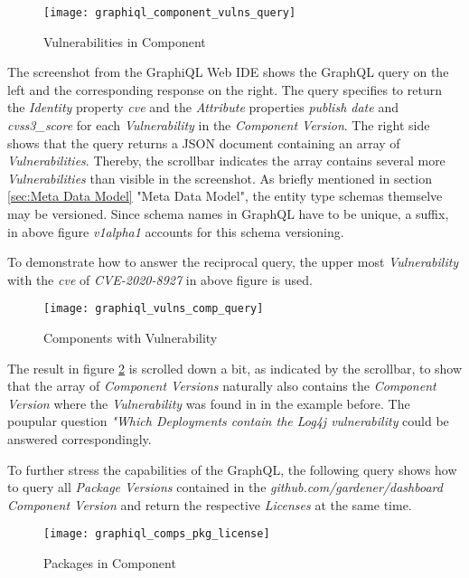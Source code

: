 \begin{figure}[H]
	\centering
	\texttt{[image: graphiql\_component\_vulns\_query]}
	\caption[Vulnerabilities in Component]{Vulnerabilities in Component }
	\label{fig:VulnsInComp}
\end{figure}

The screenshot from the GraphiQL Web IDE shows the GraphQL query on the left and the corresponding response on the right. The query specifies to return the \emph{Identity} property \emph{cve} and the \emph{Attribute} properties \emph{publish date} and \emph{cvss3\_score} for each \emph{Vulnerability} in the \emph{Component Version}. The right side shows that the query returns a JSON document containing an array of \emph{Vulnerabilities}. Thereby, the scrollbar indicates the array contains several more \emph{Vulnerabilities} than visible in the screenshot. As briefly mentioned in section \ref{sec:Meta Data Model} "Meta Data Model", the entity type schemas themselve may be versioned. Since schema names in GraphQL have to be unique, a suffix, in above figure \emph{v1alpha1} accounts for this schema versioning.\par 
To demonstrate how to answer the reciprocal query, the upper most \emph{Vulnerability} with the \emph{cve} of \emph{CVE-2020-8927} in above figure is used. 

\begin{figure}[H]
	\centering
	\texttt{[image: graphiql\_vulns\_comp\_query]}
	\caption[Components with Vulnerability]{Components with Vulnerability }
	\label{fig:CompsWithVuln}
\end{figure}

The result in figure \ref{fig:CompsWithVuln} is scrolled down a bit, as indicated by the scrollbar, to show that the array of \emph{Component Versions} naturally also contains the \emph{Component Version} where the \emph{Vulnerability} was found in in the example before. The poupular question \emph{"Which Deployments contain the Log4j vulnerability} could be answered correspondingly.\par
To further stress the capabilities of the GraphQL, the following query shows how to query all \emph{Package Versions} contained in the \emph{github.com/gardener/dashboard} \emph{Component Version} and return the respective \emph{Licenses} at the same time.

\begin{figure}[H]
	\centering
	\texttt{[image: graphiql\_comps\_pkg\_license]}
	\caption[Packages in Component]{Packages in Component }
	\label{fig:CompWithPkgs}
\end{figure}

